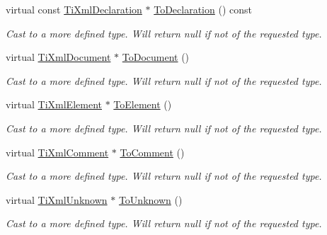 \begin{DoxyCompactItemize}
\mbox{\label{classTiXmlNode_a0dc0831e89d499ca911a3be61a413d45}} 
virtual const \hyperlink{classTiXmlDeclaration}{Ti\+Xml\+Declaration} $\ast$ \hyperlink{classTiXmlNode_a0dc0831e89d499ca911a3be61a413d45}{To\+Declaration} () const
\begin{DoxyCompactList}\small\item\em Cast to a more defined type. Will return null if not of the requested type. \end{DoxyCompactList}\item 
\mbox{\label{classTiXmlNode_a6a4c8ac28ee7a745d059db6691e03bae}} 
virtual \hyperlink{classTiXmlDocument}{Ti\+Xml\+Document} $\ast$ \hyperlink{classTiXmlNode_a6a4c8ac28ee7a745d059db6691e03bae}{To\+Document} ()
\begin{DoxyCompactList}\small\item\em Cast to a more defined type. Will return null if not of the requested type. \end{DoxyCompactList}\item 
\mbox{\label{classTiXmlNode_aa65d000223187d22a4dcebd7479e9ebc}} 
virtual \hyperlink{classTiXmlElement}{Ti\+Xml\+Element} $\ast$ \hyperlink{classTiXmlNode_aa65d000223187d22a4dcebd7479e9ebc}{To\+Element} ()
\begin{DoxyCompactList}\small\item\em Cast to a more defined type. Will return null if not of the requested type. \end{DoxyCompactList}\item 
\mbox{\label{classTiXmlNode_a383e06a0787f7063953934867990f849}} 
virtual \hyperlink{classTiXmlComment}{Ti\+Xml\+Comment} $\ast$ \hyperlink{classTiXmlNode_a383e06a0787f7063953934867990f849}{To\+Comment} ()
\begin{DoxyCompactList}\small\item\em Cast to a more defined type. Will return null if not of the requested type. \end{DoxyCompactList}\item 
\mbox{\label{classTiXmlNode_a06de5af852668c7e4af0d09c205f0b0d}} 
virtual \hyperlink{classTiXmlUnknown}{Ti\+Xml\+Unknown} $\ast$ \hyperlink{classTiXmlNode_a06de5af852668c7e4af0d09c205f0b0d}{To\+Unknown} ()
\begin{DoxyCompactList}\small\item\em Cast to a more defined type. Will return null if not of the requested type. \end{DoxyCompactList}\item 

\end{DoxyCompactItemize}
